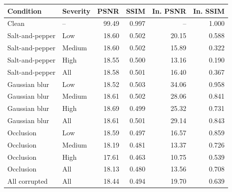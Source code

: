 \begin{tabular}{llrrrr}
\toprule
Condition & Severity & PSNR & SSIM & In. PSNR & In. SSIM \\
\midrule
Clean & -- & 99.49 & 0.997 & -- & 1.000 \\
\midrule
Salt-and-pepper & Low & 18.60 & 0.502 & 20.15 & 0.588 \\
Salt-and-pepper & Medium & 18.60 & 0.502 & 15.89 & 0.322 \\
Salt-and-pepper & High & 18.55 & 0.500 & 13.16 & 0.190 \\
Salt-and-pepper & All & 18.58 & 0.501 & 16.40 & 0.367 \\
\midrule
Gaussian blur & Low & 18.52 & 0.503 & 34.06 & 0.958 \\
Gaussian blur & Medium & 18.61 & 0.502 & 28.06 & 0.841 \\
Gaussian blur & High & 18.69 & 0.499 & 25.32 & 0.731 \\
Gaussian blur & All & 18.61 & 0.501 & 29.14 & 0.843 \\
\midrule
Occlusion & Low & 18.59 & 0.497 & 16.57 & 0.859 \\
Occlusion & Medium & 18.19 & 0.481 & 13.37 & 0.726 \\
Occlusion & High & 17.61 & 0.463 & 10.75 & 0.539 \\
Occlusion & All & 18.13 & 0.480 & 13.56 & 0.708 \\
\midrule
All corrupted & All & 18.44 & 0.494 & 19.70 & 0.639 \\
\bottomrule
\end{tabular}
